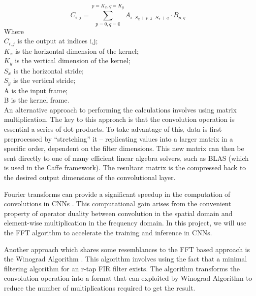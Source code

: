 \documentclass[conference,compsoc]{IEEEtran/IEEEtran}
\begin{document}
\begin{equation}\label{eq:conv}
C_{i,j} = \sum_{p=0,q=0}^{p=K_x,q=K_y}A_{i\cdot S_y + p, j\cdot S_x + q}\cdot B_{p,q}
\end{equation}
Where\\
\hspace*{2em} $C_{i,j}$ is the output at indices i,j;\\
\hspace*{2em} $K_x$ is the horizontal dimension of the kernel;\\
\hspace*{2em} $K_y$ is the vertical dimension of the kernel;\\
\hspace*{2em} $S_x$ is the horizontal stride;\\
\hspace*{2em} $S_y$ is the vertical stride;\\
\hspace*{2em} A is the input frame;\\
\hspace*{2em} B is the kernel frame.\\

An alternative approach to performing the calculations involves using matrix multiplication.
The key to this approach is that the convolution operation is essential a series of dot products.
To take advantage of this, data is first preprocessed by ``stretching'' it -- replicating values into a larger matrix in a specific order, dependent on the filter dimensions.
This new matrix can then be sent directly to one of many efficient linear algebra solvers, such as BLAS (which is used in the Caffe framework).
The resultant matrix is the compressed back to the desired output dimensions of the convolutional layer.

Fourier transforms can provide a significant speedup in the computation of convolutions in CNNs \cite{FFT1, FFT2}. This computational gain arises from the convenient property of operator duality between convolution in the spatial domain and element-wise multiplication in the frequency domain. In this project, we will use the FFT algorithm to accelerate the training and inference in CNNs.

Another approach which shares some resemblances to the FFT based approach is the Winograd Algorithm \cite{winograd}. 
This algorithm involves using the fact that a minimal filtering algorithm for an r-tap FIR filter exists. The 
algorithm transforms the convolution operation into a format that can exploited by Winograd Algorithm to reduce the
number of multiplications required to get the result. 
\end{document}
